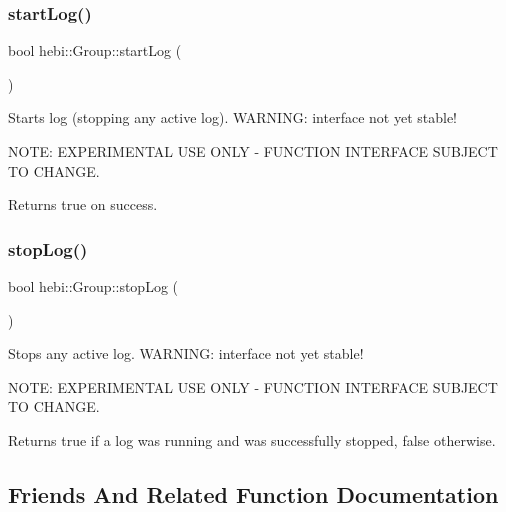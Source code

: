 \subsubsection{\texorpdfstring{start\+Log()}{startLog()}}
{\footnotesize\ttfamily bool hebi\+::\+Group\+::start\+Log (\begin{DoxyParamCaption}{ }\end{DoxyParamCaption})}



Starts log (stopping any active log). W\+A\+R\+N\+I\+NG\+: interface not yet stable! 

N\+O\+TE\+: E\+X\+P\+E\+R\+I\+M\+E\+N\+T\+AL U\+SE O\+N\+LY -\/ F\+U\+N\+C\+T\+I\+ON I\+N\+T\+E\+R\+F\+A\+CE S\+U\+B\+J\+E\+CT TO C\+H\+A\+N\+GE.

\begin{DoxyReturn}{Returns}
true on success. 
\end{DoxyReturn}
\mbox{\label{classhebi_1_1Group_adbbbbe95f600cb2843c1b51281a74744}} 
\subsubsection{\texorpdfstring{stop\+Log()}{stopLog()}}
{\footnotesize\ttfamily bool hebi\+::\+Group\+::stop\+Log (\begin{DoxyParamCaption}{ }\end{DoxyParamCaption})}



Stops any active log. W\+A\+R\+N\+I\+NG\+: interface not yet stable! 

N\+O\+TE\+: E\+X\+P\+E\+R\+I\+M\+E\+N\+T\+AL U\+SE O\+N\+LY -\/ F\+U\+N\+C\+T\+I\+ON I\+N\+T\+E\+R\+F\+A\+CE S\+U\+B\+J\+E\+CT TO C\+H\+A\+N\+GE.

\begin{DoxyReturn}{Returns}
true if a log was running and was successfully stopped, false otherwise. 
\end{DoxyReturn}


\subsection{Friends And Related Function Documentation}
\mbox{\label{classhebi_1_1Group_a895e36298e0e77c27c644c4e3edea356}} 
